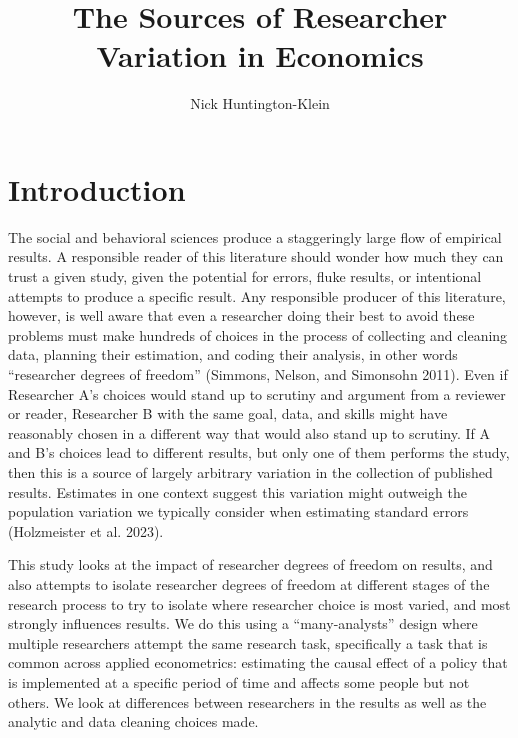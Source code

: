 \documentclass[
  letterpaper,
  DIV=11,
  numbers=noendperiod]{scrartcl}
\title{The Sources of Researcher Variation in Economics}
\author{Nick Huntington-Klein}
\date{}
\begin{document}
\maketitle
\ifdefined\Shaded\renewenvironment{Shaded}{\begin{tcolorbox}[sharp corners, breakable, enhanced, frame hidden, interior hidden, borderline west={3pt}{0pt}{shadecolor}, boxrule=0pt]}{\end{tcolorbox}}\fi

\hypertarget{introduction}{%
\section{Introduction}\label{introduction}}

The social and behavioral sciences produce a staggeringly large flow of
empirical results. A responsible reader of this literature should wonder
how much they can trust a given study, given the potential for errors,
fluke results, or intentional attempts to produce a specific result. Any
responsible producer of this literature, however, is well aware that
even a researcher doing their best to avoid these problems must make
hundreds of choices in the process of collecting and cleaning data,
planning their estimation, and coding their analysis, in other words
``researcher degrees of freedom'' (Simmons, Nelson, and Simonsohn 2011).
Even if Researcher A's choices would stand up to scrutiny and argument
from a reviewer or reader, Researcher B with the same goal, data, and
skills might have reasonably chosen in a different way that would also
stand up to scrutiny. If A and B's choices lead to different results,
but only one of them performs the study, then this is a source of
largely arbitrary variation in the collection of published results.
Estimates in one context suggest this variation might outweigh the
population variation we typically consider when estimating standard
errors (Holzmeister et al. 2023).

This study looks at the impact of researcher degrees of freedom on
results, and also attempts to isolate researcher degrees of freedom at
different stages of the research process to try to isolate where
researcher choice is most varied, and most strongly influences results.
We do this using a ``many-analysts'' design where multiple researchers
attempt the same research task, specifically a task that is common
across applied econometrics: estimating the causal effect of a policy
that is implemented at a specific period of time and affects some people
but not others. We look at differences between researchers in the
results as well as the analytic and data cleaning choices made.
\end{document}
